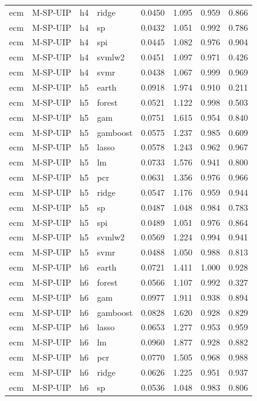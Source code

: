 \begin{ThreePartTable}
\begin{longtable}[t]{llclcccc}
ecm & M-SP-UIP & h4 & ridge & 0.0450 & 1.095 & 0.959 & 0.866\\
ecm & M-SP-UIP & h4 & sp & 0.0432 & 1.051 & 0.992 & 0.786\\
ecm & M-SP-UIP & h4 & spi & 0.0445 & 1.082 & 0.976 & 0.904\\
ecm & M-SP-UIP & h4 & svmlw2 & 0.0451 & 1.097 & 0.971 & 0.426\\
ecm & M-SP-UIP & h4 & svmr & 0.0438 & 1.067 & 0.999 & 0.969\\
\addlinespace
ecm & M-SP-UIP & h5 & earth & 0.0918 & 1.974 & 0.910 & 0.211\\
ecm & M-SP-UIP & h5 & forest & 0.0521 & 1.122 & 0.998 & 0.503\\
ecm & M-SP-UIP & h5 & gam & 0.0751 & 1.615 & 0.954 & 0.840\\
ecm & M-SP-UIP & h5 & gamboost & 0.0575 & 1.237 & 0.985 & 0.609\\
ecm & M-SP-UIP & h5 & lasso & 0.0578 & 1.243 & 0.962 & 0.967\\
ecm & M-SP-UIP & h5 & lm & 0.0733 & 1.576 & 0.941 & 0.800\\
ecm & M-SP-UIP & h5 & pcr & 0.0631 & 1.356 & 0.976 & 0.966\\
ecm & M-SP-UIP & h5 & ridge & 0.0547 & 1.176 & 0.959 & 0.944\\
ecm & M-SP-UIP & h5 & sp & 0.0487 & 1.048 & 0.984 & 0.783\\
ecm & M-SP-UIP & h5 & spi & 0.0489 & 1.051 & 0.976 & 0.864\\
ecm & M-SP-UIP & h5 & svmlw2 & 0.0569 & 1.224 & 0.994 & 0.941\\
ecm & M-SP-UIP & h5 & svmr & 0.0488 & 1.050 & 0.988 & 0.813\\
\addlinespace
ecm & M-SP-UIP & h6 & earth & 0.0721 & 1.411 & 1.000 & 0.928\\
ecm & M-SP-UIP & h6 & forest & 0.0566 & 1.107 & 0.992 & 0.327\\
ecm & M-SP-UIP & h6 & gam & 0.0977 & 1.911 & 0.938 & 0.894\\
ecm & M-SP-UIP & h6 & gamboost & 0.0828 & 1.620 & 0.928 & 0.829\\
ecm & M-SP-UIP & h6 & lasso & 0.0653 & 1.277 & 0.953 & 0.959\\
ecm & M-SP-UIP & h6 & lm & 0.0960 & 1.877 & 0.928 & 0.882\\
ecm & M-SP-UIP & h6 & pcr & 0.0770 & 1.505 & 0.968 & 0.988\\
ecm & M-SP-UIP & h6 & ridge & 0.0626 & 1.225 & 0.951 & 0.937\\
ecm & M-SP-UIP & h6 & sp & 0.0536 & 1.048 & 0.983 & 0.806\\

\end{longtable}
\end{ThreePartTable}
